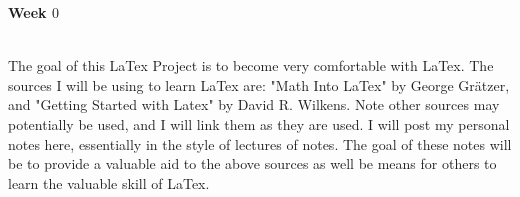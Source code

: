\documentclass{article}
\begin{document}
\begin{center}
\textbf{Week $0$}
\end{center}
\\

The goal of this LaTex Project is to become very comfortable with LaTex. The sources I will be using to learn LaTex are: "Math Into LaTex" by George Grätzer, and  "Getting Started with Latex" by David R. Wilkens. Note other sources may potentially be used, and I will link them as they are used. I will post my personal notes here, essentially in the style of lectures of notes. The goal of these notes will be to provide a valuable aid to the above sources as well be means for others to learn the valuable skill of LaTex. 
\end{document}
